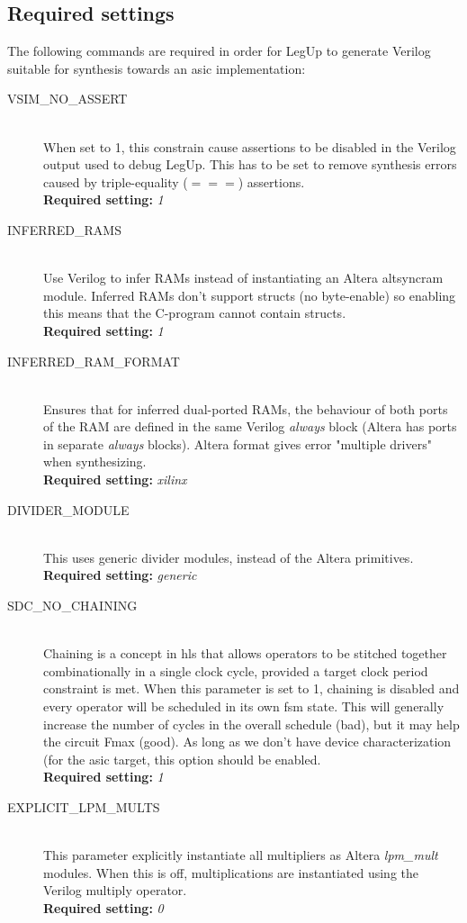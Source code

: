 \subsection{\label{subsec:hlsreqconst}Required settings}
The following commands are required in order for LegUp to generate Verilog suitable for synthesis towards an \gls{asic} implementation:
\begin{description}
  \item[VSIM\_NO\_ASSERT] \hfill \\
      When set to 1, this constrain cause assertions to be disabled in the Verilog output used to debug LegUp. This has to be set to remove synthesis errors caused by triple-equality ($===$) assertions. \hfill \\
      \textbf{Required setting:} \textit{1}
  \item[INFERRED\_RAMS] \hfill \\
      Use Verilog to infer RAMs instead of instantiating an Altera altsyncram module. Inferred RAMs don’t support structs (no byte-enable) so enabling this means that the C-program cannot contain structs. \hfill \\
      \textbf{Required setting:} \textit{1}
  \item[INFERRED\_RAM\_FORMAT] \hfill \\
      Ensures that for inferred dual-ported RAMs, the behaviour of both ports of the RAM are defined in the same Verilog \textit{always} block (Altera has ports in separate \textit{always} blocks). Altera format gives error "multiple drivers" when synthesizing.\hfill \\
      \textbf{Required setting:} \textit{xilinx}
  \item[DIVIDER\_MODULE] \hfill \\
      This uses generic divider modules, instead of the Altera primitives.\hfill \\
      \textbf{Required setting:} \textit{generic}
  \item[SDC\_NO\_CHAINING] \hfill \\
      Chaining is a concept in \gls{hls} that allows operators to be stitched together combinationally in a single clock cycle, provided a target clock period constraint is met. When this parameter is set to 1, chaining is disabled and every operator will be scheduled in its own \gls{fsm} state. This will generally increase the number of cycles in the overall schedule (bad), but it may help the circuit Fmax (good). As long as we don't have device characterization (for the \gls{asic} target, this option should be enabled.\hfill \\
      \textbf{Required setting:} \textit{1}
  \item[EXPLICIT\_LPM\_MULTS] \hfill \\
      This parameter explicitly instantiate all multipliers as Altera \textit{lpm\_mult} modules. When this is off, multiplications are instantiated using the Verilog multiply operator.\hfill \\
      \textbf{Required setting:} \textit{0}
\end{description}
